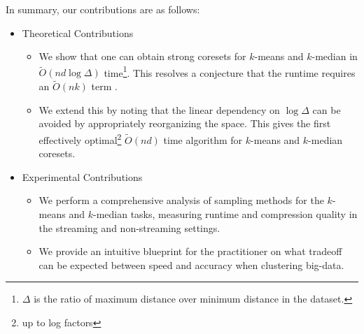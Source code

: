 In summary, our contributions are as follows:
\begin{itemize}
    \item Theoretical Contributions
    \begin{itemize}
        \item We show that one can obtain strong coresets for $k$-means and $k$-median in $\tilde{O}(nd \log \Delta)$ time\footnote{$\Delta$ is the ratio of
            maximum distance over minimum distance in the dataset.}.  This resolves a conjecture that the runtime requires an $\tilde{O}(nk)$ term \cite{DSWY22}. 
        \item We extend this by noting that the linear dependency on $\log \Delta$ can be avoided by appropriately reorganizing the space. This gives the first
            effectively optimal\footnote{up to log factors} $\tilde{O}(nd)$ time algorithm for $k$-means and $k$-median coresets.
    \end{itemize}
    \item Experimental Contributions
    \begin{itemize}
        \item We perform a comprehensive analysis of sampling methods for the $k$-means and $k$-median tasks, measuring runtime and compression quality in the streaming and non-streaming settings.
        \item We provide an intuitive blueprint for the practitioner on what tradeoff can be expected between speed and accuracy when clustering big-data. 
    \end{itemize}
\end{itemize}
